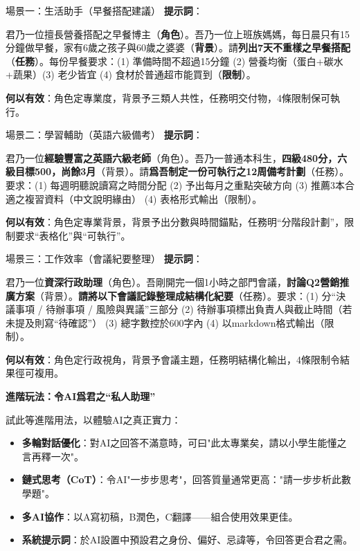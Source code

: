 
\begin{tcbinfo}{場景一：生活助手（早餐搭配建議）}
\textbf{提示詞}：

君乃一位擅長營養搭配之早餐博主（\textbf{角色}）。吾乃一位上班族媽媽，每日晨只有15分鐘做早餐，家有6歲之孩子與60歲之婆婆（\textbf{背景}）。請\textbf{列出7天不重樣之早餐搭配}（\textbf{任務}）。每份早餐要求：(1) 準備時間不超過15分鐘 (2) 營養均衡（蛋白+碳水+蔬果）(3) 老少皆宜 (4) 食材於普通超市能買到（\textbf{限制}）。

\textbf{何以有效}：角色定專業度，背景予三類人共性，任務明交付物，4條限制保可執行。

\end{tcbinfo}

\begin{tcbinfo}{場景二：學習輔助（英語六級備考）}
\textbf{提示詞}：

君乃一位\textbf{經驗豐富之英語六級老師}（角色）。吾乃一普通本科生，\textbf{四級480分，六級目標500，尚餘3月}（背景）。請\textbf{爲吾制定一份可執行之12周備考計劃}（任務）。要求：(1) 每週明聽說讀寫之時間分配 (2) 予出每月之重點突破方向 (3) 推薦3本合適之複習資料（中文說明緣由） (4) 表格形式輸出（限制）。

\textbf{何以有效}：角色定專業背景，背景予出分數與時間錨點，任務明“分階段計劃”，限制要求“表格化”與“可執行”。

\end{tcbinfo}

\begin{tcbinfo}{場景三：工作效率（會議紀要整理）}
\textbf{提示詞}：

君乃一位\textbf{資深行政助理}（角色）。吾剛開完一個1小時之部門會議，\textbf{討論Q2營銷推廣方案}（背景）。\textbf{請將以下會議記錄整理成結構化紀要}（任務）。要求：(1) 分“決議事項 / 待辦事項 / 風險與異議”三部分 (2) 待辦事項標出負責人與截止時間（若未提及則寫“待確認”） (3) 總字數控於600字內 (4) 以markdown格式輸出（限制）。

\textbf{何以有效}：角色定行政視角，背景予會議主題，任務明結構化輸出，4條限制令結果徑可複用。

\end{tcbinfo}

\textbf{進階玩法：令AI爲君之“私人助理”}\par

試此等進階用法，以體驗AI之真正實力：

\begin{itemize}
  \item \textbf{多輪對話優化}：對AI之回答不滿意時，可曰"此太專業矣，請以小學生能懂之言再釋一次"。
  \item \textbf{鏈式思考（CoT）}：令AI"一步步思考"，回答質量通常更高："請一步步析此數學題"。
  \item \textbf{多AI協作}：以A寫初稿，B潤色，C翻譯——組合使用效果更佳。
  \item \textbf{系統提示詞}：於AI設置中預設君之身份、偏好、忌諱等，令回答更合君之需。
\end{itemize}

